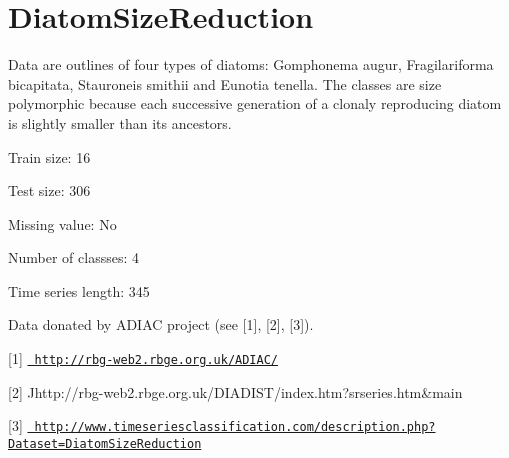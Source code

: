 \chapter{Diatom\+Size\+Reduction}
\hypertarget{md_external_2data_2UCRArchive__2018_2DiatomSizeReduction_2README}{}\label{md_external_2data_2UCRArchive__2018_2DiatomSizeReduction_2README}
\label{md_external_2data_2UCRArchive__2018_2DiatomSizeReduction_2README_autotoc_md41}%
%
 Data are outlines of four types of diatoms\+: Gomphonema augur, Fragilariforma bicapitata, Stauroneis smithii and Eunotia tenella. The classes are size polymorphic because each successive generation of a clonaly reproducing diatom is slightly smaller than its ancestors.

Train size\+: 16

Test size\+: 306

Missing value\+: No

Number of classses\+: 4

Time series length\+: 345

Data donated by ADIAC project (see \mbox{[}1\mbox{]}, \mbox{[}2\mbox{]}, \mbox{[}3\mbox{]}).

\mbox{[}1\mbox{]} \href{http://rbg-web2.rbge.org.uk/ADIAC/}{\texttt{ http\+://rbg-\/web2.\+rbge.\+org.\+uk/\+ADIAC/}}

\mbox{[}2\mbox{]} Jhttp\+://rbg-\/web2.rbge.\+org.\+uk/\+DIADIST/index.htm?srseries.\+htm\&main

\mbox{[}3\mbox{]} \href{http://www.timeseriesclassification.com/description.php?Dataset=DiatomSizeReduction}{\texttt{ http\+://www.\+timeseriesclassification.\+com/description.\+php?\+Dataset=\+Diatom\+Size\+Reduction}} 